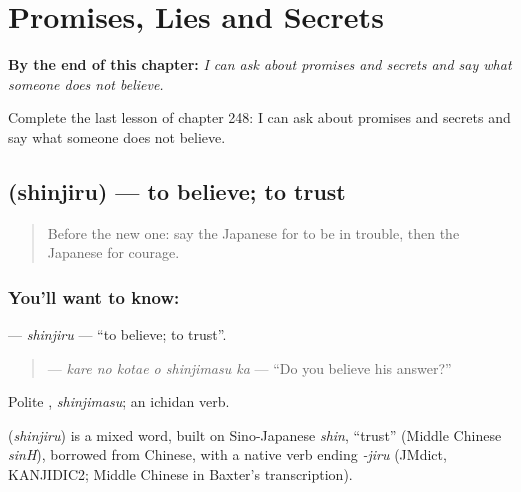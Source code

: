 
\chapter{Promises, Lies and Secrets}
\label{ch:ja-promises-lies-and-secrets}

\begin{chapteropening}
\textbf{By the end of this chapter:} \emph{I can ask about promises and secrets and say what someone does not believe.}

Complete the last lesson of chapter 248: I can ask about promises and secrets and say what someone does not believe.
\end{chapteropening}

\section[\texorpdfstring{\ja{しんじる} (shinjiru)}{しんじる (shinjiru)}]{ (shinjiru) — to believe; to trust}

\label{lesson:JA-C248-shinjiru}



\begin{quote}
Before the new one: say the Japanese for to be in trouble, then the Japanese for courage.
\end{quote}

\subsection*{You'll want to know: }
\textbf{} — \emph{shinjiru} — \textquotedblleft{}to believe; to trust\textquotedblright{}.

\begin{quote}
\textbf{  } — \emph{kare no kotae o shinjimasu ka} — \textquotedblleft{}Do you believe his answer?\textquotedblright{}
\end{quote}

Polite \textbf{}, \emph{shinjimasu}; an ichidan verb.

\begin{cousinweb}
\textbf{} (\emph{shinjiru}) is a mixed word, built on Sino-Japanese \emph{shin}, \textquotedblleft{}trust\textquotedblright{} (Middle Chinese \emph{sinH}), borrowed from Chinese, with a native verb ending \emph{-jiru} (JMdict, KANJIDIC2; Middle Chinese in Baxter's transcription).
\end{cousinweb}

